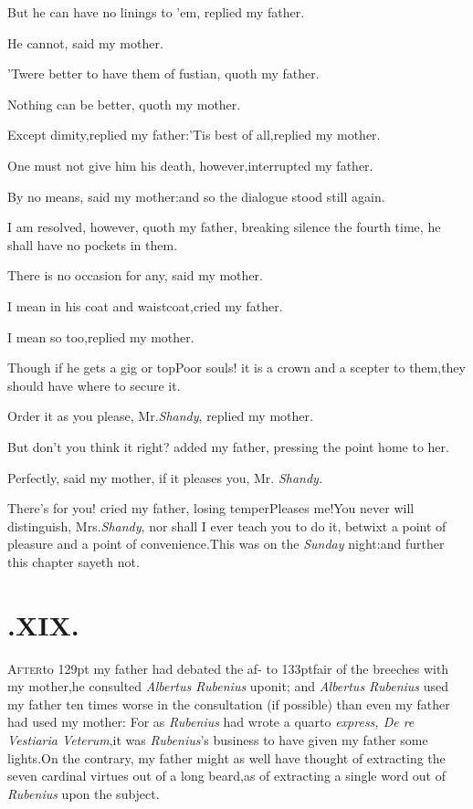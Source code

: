 \documentclass{article}
\begin{document}
But he can have no linings to ’em, replied my
father.\tsh

He cannot, said my mother.

’Twere better to have them of fustian, quoth my
father.

Nothing can be better, quoth my mother.\tsh

\tsh Except dimity,\tsk replied my
father:\tsh ’Tis best of all,\tsk replied my
mother.

\tsh One must not give him his death,
however,\tsk interrupted my father.

By no means, said my mother:\tsh and so the dialogue
stood still again.

\newpage
I am resolved, however, quoth my\break 
father, breaking silence the fourth time,\break
he shall have no pockets in them.\tsh

\tsh There is no occasion for any,\break
said my mother.\tsh

I mean in his coat and waistcoat,\tsk cried my father.

\tsh I mean so too,\tsk replied my mother.

\tsh Though if he gets a gig or top\break\tsh Poor
souls! it is a crown and a scepter to them,\tsk they should have
where to secure it.\tsh

Order it as you please, Mr.\@ \textit{Shandy}, replied my
mother.\tsh

\newpage
\tsh But don’t you think it right? added my
father, pressing the point home to her.

Perfectly, said my mother, if it pleases you, Mr.
\textit{Shandy.}\tsh

\tsh There’s for you! cried my father, losing
temper\tsh Pleases me!\tsh You never will
distinguish, Mrs.\@ \textit{Shandy}, nor shall I ever teach you to do it, betwixt a point of
pleasure and a point of convenience.\tsh This was on the
\textit{Sunday} night:\tsh and further this chapter sayeth
not.

\smallskip

\section{.\enspace XIX.}

\lettrine{A}{\!fter}\hbox to 129pt{ my father had debated the af-}\break
\hbox to 133pt{{\!fair of the breeches with my mother,}}\break\tsk he consulted
\textit{Albertus Rubenius} upon\pb it; and \textit{Albertus Rubenius} used
my father ten times worse in the consultation (if possible) than
even my father had used my mother: For as \textit{Rubenius} had wrote
a quarto \textit{express, De re Vestiaria Veterum},\tsk it was
\textit{Rubenius}’s business to have given my father some
lights.\tsk On the contrary, my father might as well have thought
of extracting the seven cardinal virtues out of a long
beard,\tsk as of extracting a single word out of \textit{Rubenius}
upon the subject.
\end{document}
